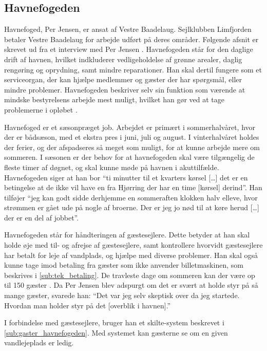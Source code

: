 \subsection{Havnefogeden} \label{sub:havnefoged}

Havnefoged, Per Jensen, er ansat af Vestre Baadelaug. Sejlklubben Limfjorden betaler Vestre Baadelaug for arbejde udført på deres områder. Følgende afsnit er skrevet ud fra et interview med Per Jensen \cite{int_hf}. Havnefogeden står for den daglige drift af havnen, hvilket indkluderer vedligeholdelse af grønne arealer, daglig rengøring og oprydning, samt mindre reparationer. Han skal dertil fungere som et serviceorgan, der kan hjælpe medlemmer og gæster der har spørgsmål, eller mindre problemer. Havnefogeden beskriver selv sin funktion som værende at mindske bestyrelsens arbejde mest muligt, hvilket han gør ved at tage problemerne i opløbet \cite{int_hf}.

Havnefoged er et sæsonpræget job. Arbejdet er primært i sommerhalvåret, hvor der er bådsæson, med et ekstra pres i juni, juli og august. I vinterhalvåret holdes der ferier, og der afspadseres så meget som muligt, for at kunne arbejde mere om sommeren. I sæsonen er der behov for at havnefogeden skal være tilgængelig de fleste timer af døgnet, og skal kunne møde på havnen i akuttilfælde. Havnefogeden siger at han bor \enquote{ti minutter til et kvarters kørsel [\ldots] det er en betingelse at de ikke vil have en fra Hjørring der har en time [kørsel] derind}. Han tilføjer \enquote{jeg kan godt sidde derhjemme en sommeraften klokken halv elleve, hvor strømmen er gået ude på nogle af broerne. Der er jeg jo nød til at køre herud [\ldots] der er en del af jobbet}.

Havnefogeden står for håndteringen af gæstesejlere. Dette betyder at han skal holde øje med til- og afrejse af gæstesejlere, samt kontrollere hvorvidt gæstesejlere har betalt for leje af vandplads, og hjælpe med diverse problemer. Han skal også kunne tage imod betaling fra gæster som ikke anvender billetmaskinen, som beskrives i \cref{sub:tek_betaling}. De travleste dage om sommeren kan der være op til 150 gæster \cite{int_hf}. Da Per Jensen blev adspurgt om det er svært at holde styr på så mange gæster, svarede han: \enquote{Det var jeg selv skeptisk over da jeg startede. Hvordan man holder styr på det [overblik i havnen].}

I forbindelse med gæstesejlere, bruger han et skilte-system beskrevet i \cref{sub:gaster_havnefogeden}. Med systemet kan gæsterne se om en given vandlejeplads er ledig.
